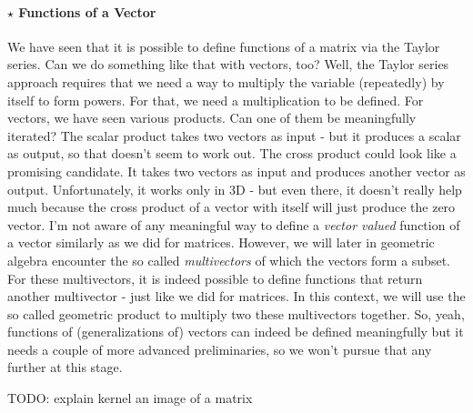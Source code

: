 

\paragraph{$\star$ Functions of a Vector}
We have seen that it is possible to define functions of a matrix via the Taylor series. Can we do something like that with vectors, too? Well, the Taylor series approach requires that we need a way to multiply the variable (repeatedly) by itself to form powers. For that, we need a multiplication to be defined. For vectors, we have seen various products. Can one of them be meaningfully iterated? The scalar product takes two vectors as input - but it produces a scalar as output, so that doesn't seem to work out. The cross product could look like a promising candidate. It takes two vectors as input and produces another vector as output. Unfortunately, it works only in 3D - but even there, it doesn't really help much because the cross product of a vector with itself will just produce the zero vector. I'm not aware of any meaningful way to define a \emph{vector valued} function of a vector similarly as we did for matrices. However, we will later in geometric algebra encounter the so called \emph{multivectors} of which the vectors form a subset. For these multivectors, it is indeed possible to define functions that return another multivector - just like we did for matrices. In this context, we will use the so called geometric product to multiply two these multivectors together. So, yeah, functions of (generalizations of) vectors can indeed be defined meaningfully but it needs a couple of more advanced preliminaries, so we won't pursue that any further at this stage.


\medskip
TODO: explain kernel an image of a matrix





